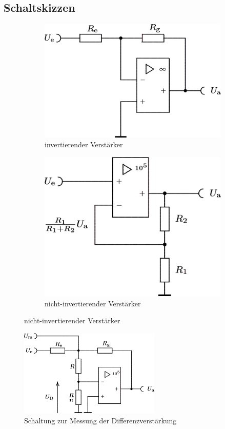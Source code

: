 \documentclass[numbers=noenddot,12pt,a4paper]{scrartcl}
\begin{document}
\subsection{Schaltskizzen}
\begin{figure}[H]
\centering
\begin{subfigure}[b]{0.48\textwidth}
\includegraphics[width=\textwidth]{invertierender.png}
\caption{invertierender Verstärker} \label{img:invert}
\end{subfigure}
\begin{subfigure}[b]{0.48\textwidth}
\includegraphics[width=\textwidth]{nichtinvert.png}
\caption{nicht-invertierender Verstärker} \label{img:ninvert}
\end{subfigure}
\end{figure}
\begin{figure}[H]
\centering
\includegraphics[width=0.6\textwidth]{messungssch.png}
\caption{Schaltung zur Messung der Differenzverstärkung} \label{img:messung}
\end{figure}
\end{document}
